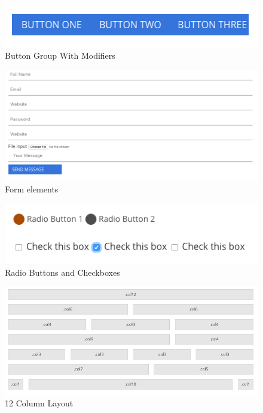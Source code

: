 \begin{figure}[h]
\caption{Button Group With Modifiers}
  \label{fig:modButtonGroup}
\includegraphics[scale=0.5]{../public/images/buttongroups}
\centering
\end{figure}

\begin{figure}[h]
\caption{Form elements}
  \label{fig:form}
\includegraphics[scale=0.3]{../public/images/form}
\centering
\end{figure}


\begin{figure}[h]
\caption{Radio Buttons and Checkboxes}
  \label{fig:radio}
\includegraphics[scale=0.5]{../public/images/radio}
\centering
\end{figure}


\begin{figure}[h]
\caption{12 Column Layout}
  \label{fig:columnlayout}
  \includegraphics[scale=0.4]{../public/images/columnlayout}
\centering
\end{figure}

